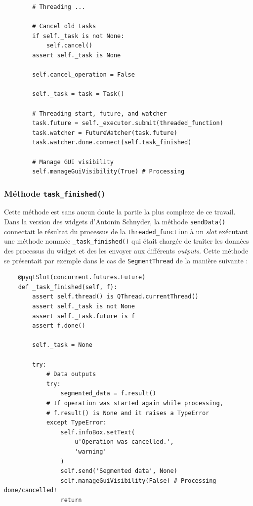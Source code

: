 \documentclass{article}
\begin{document}
{\begin{verbatim}
        # Threading ...

        # Cancel old tasks
        if self._task is not None:
            self.cancel()
        assert self._task is None

        self.cancel_operation = False

        self._task = task = Task()
        
        # Threading start, future, and watcher
        task.future = self._executor.submit(threaded_function)
        task.watcher = FutureWatcher(task.future)
        task.watcher.done.connect(self.task_finished)
        
        # Manage GUI visibility
        self.manageGuiVisibility(True) # Processing
\end{verbatim}

\subsubsection{Méthode \texttt{task\_finished()}}

Cette méthode est sans aucun doute la partie la plus complexe de ce travail. Dans la version des widgets d'Antonin Schnyder, la méthode \texttt{sendData()} connectait le résultat du processus de la \texttt{threaded\_function} à un \textit{slot} exécutant une méthode nommée \texttt{\_task\_finished()} qui était chargée de traiter les données des processus du widget et des les envoyer aux différents \textit{outputs}. Cette méthode se présentait par exemple dans le cas de \texttt{SegmentThread} de la manière suivante : 

\begin{verbatim}
    @pyqtSlot(concurrent.futures.Future)
    def _task_finished(self, f):
        assert self.thread() is QThread.currentThread()
        assert self._task is not None
        assert self._task.future is f
        assert f.done()

        self._task = None

        try:
            # Data outputs
            try:
                segmented_data = f.result()
            # If operation was started again while processing,
            # f.result() is None and it raises a TypeError
            except TypeError:
                self.infoBox.setText(
                    u'Operation was cancelled.',
                    'warning'
                )
                self.send('Segmented data', None)
                self.manageGuiVisibility(False) # Processing done/cancelled!
                return


\end{verbatim}}
\end{document}
